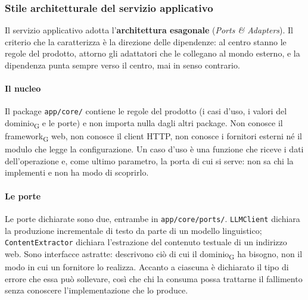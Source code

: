 \documentclass[a4paper, 10pt]{article}
\begin{document}

\subsubsection{Stile architetturale del servizio applicativo}
\label{sec:panoramica-stile-servizio}
Il servizio applicativo adotta l'\textbf{architettura esagonale} (\textit{Ports \& Adapters}). Il criterio che la caratterizza è la direzione delle dipendenze: al centro stanno le regole del prodotto, attorno gli adattatori che le collegano al mondo esterno, e la dipendenza punta sempre verso il centro, mai in senso contrario.

\paragraph{Il nucleo}
Il package \texttt{app/core/} contiene le regole del prodotto (i casi d'uso, i valori del dominio\textsubscript{G} e le porte) e non importa nulla dagli altri package. Non conosce il framework\textsubscript{G} web, non conosce il client HTTP, non conosce i fornitori esterni né il modulo che legge la configurazione. Un caso d'uso è una funzione che riceve i dati dell'operazione e, come ultimo parametro, la porta di cui si serve: non sa chi la implementi e non ha modo di scoprirlo.

\paragraph{Le porte}
Le porte dichiarate sono due, entrambe in \texttt{app/core/ports/}. \texttt{LLMClient} dichiara la produzione incrementale di testo da parte di un modello linguistico; \texttt{ContentExtractor} dichiara l'estrazione del contenuto testuale di un indirizzo web. Sono interfacce astratte: descrivono ciò di cui il dominio\textsubscript{G} ha bisogno, non il modo in cui un fornitore lo realizza. Accanto a ciascuna è dichiarato il tipo di errore che essa può sollevare, così che chi la consuma possa trattarne il fallimento senza conoscere l'implementazione che lo produce.
\end{document}
